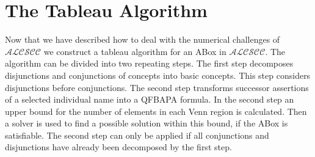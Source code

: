 \documentclass{book}
\theoremstyle{break}
\theoremstyle{definition}
\begin{document}
\section{The Tableau Algorithm}\label{Tableau}
Now that we have described how to deal with the numerical challenges of $\mathcal{ALCSCC}$ we construct a tableau algorithm for an ABox in $\mathcal{ALCSCC}$. The algorithm can be divided into two repeating steps. The first step decomposes disjunctions and conjunctions of concepts into basic concepts. This step considers disjunctions before conjunctions. The second step transforms successor assertions of a selected individual name into a QFBAPA formula. In the second step an upper bound for the number of elements in each Venn region is calculated. Then a solver is used to find a possible solution within this bound, if the ABox is satisfiable. The second step can only be applied if all conjunctions and disjunctions have already been decomposed by the first step. 
\end{document}
